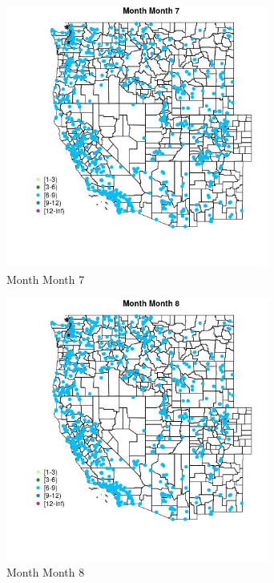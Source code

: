 \begin{figure} 
\centering  
\includegraphics[width=0.77\textwidth]{Code_Outputs/Report_ML_input_PM25_Step4_part_e_de_duplicated_aveswNAs_MapObsMo7Month.jpg} 
\caption{\label{fig:Report_ML_input_PM25_Step4_part_e_de_duplicated_aveswNAsMapObsMo7Month}Month Month 7} 
\end{figure} 
 

\clearpage 

\begin{figure} 
\centering  
\includegraphics[width=0.77\textwidth]{Code_Outputs/Report_ML_input_PM25_Step4_part_e_de_duplicated_aveswNAs_MapObsMo8Month.jpg} 
\caption{\label{fig:Report_ML_input_PM25_Step4_part_e_de_duplicated_aveswNAsMapObsMo8Month}Month Month 8} 
\end{figure} 
 

